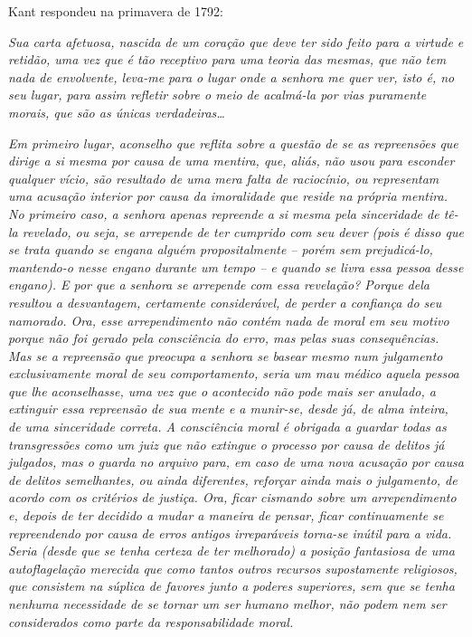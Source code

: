 \bigskip
Kant respondeu na primavera de 1792:

\emph{Sua carta afetuosa, nascida de um coração que deve ter sido feito
para a virtude e retidão, uma vez que é tão receptivo para uma teoria
das mesmas, que não tem nada de envolvente, leva-me para o lugar onde a
senhora me quer ver, isto é, no seu lugar, para assim refletir sobre o
meio de acalmá-la por vias puramente morais, que são as únicas
verdadeiras\ldots{}}

\emph{Em primeiro lugar, aconselho que reflita sobre a questão de se as
repreensões que dirige a si mesma por causa de uma mentira, que, aliás,
não usou para esconder qualquer vício, são resultado de uma mera falta
de raciocínio, ou representam uma acusação interior por causa da
imoralidade que reside na própria mentira. No primeiro caso, a senhora
apenas repreende a si mesma pela sinceridade de tê-la revelado, ou seja,
se arrepende de ter cumprido com seu dever (pois é disso que se trata
quando se engana alguém propositalmente -- porém sem prejudicá-lo,
mantendo-o nesse engano durante um tempo -- e quando se livra essa
pessoa desse engano). E por que a senhora se arrepende com essa
revelação? Porque dela resultou a desvantagem, certamente considerável,
de perder a confiança do seu namorado. Ora, esse arrependimento não
contém nada de moral em seu motivo porque não foi gerado pela
consciência do erro, mas pelas suas consequências. Mas se a repreensão
que preocupa a senhora se basear mesmo num julgamento exclusivamente
moral de seu comportamento, seria um mau médico aquela pessoa que lhe
aconselhasse, uma vez que o acontecido não pode mais ser anulado, a
extinguir essa repreensão de sua mente e a munir-se, desde já, de alma
inteira, de uma sinceridade correta. A consciência moral é obrigada a
guardar todas as transgressões como um juiz que não extingue o processo
por causa de delitos já julgados, mas o guarda no arquivo para, em caso
de uma nova acusação por causa de delitos semelhantes, ou ainda
diferentes, reforçar ainda mais o julgamento, de acordo com os critérios
de justiça. Ora, ficar cismando sobre um arrependimento e, depois de ter
decidido a mudar a maneira de pensar, ficar continuamente se
repreendendo por causa de erros antigos irreparáveis torna-se inútil
para a vida. Seria (desde que se tenha certeza de ter melhorado) a
posição fantasiosa de uma autoflagelação merecida que como tantos outros
recursos supostamente religiosos, que consistem na súplica de favores
junto a poderes superiores, sem que se tenha nenhuma necessidade de se
tornar um ser humano melhor, não podem nem ser considerados como parte
da responsabilidade moral.}

